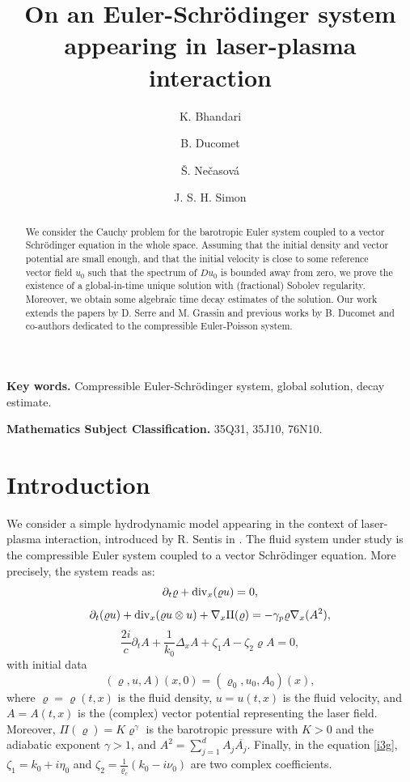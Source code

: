 \documentclass[11pt,twoside]{amsart}
\newcommand{\bFormula}[1]{\begin{equation} \label{#1}}
\newcommand{\eF}{\end{equation}}
\newcommand{\Div}{{\rm div}_x}
\newcommand{\Grad}{\nabla_x}
\newcommand{\vr}{\varrho}
\begin{document}
\title[On an Euler-Schr\"{o}dinger system appearing in laser-plasma interaction]{On an Euler-Schr\"{o}dinger system appearing in laser-plasma interaction}
\author{K. Bhandari \and B. Ducomet \and \v S. Ne\v{c}asov\'{a} \and J. S. H. Simon}

\begin{abstract}
 We consider the Cauchy problem for the barotropic Euler system coupled to a vector Schr\"{o}dinger equation in the whole space.
Assuming that the initial density and vector potential are small enough, and that the initial velocity is  close to some
reference vector field $u_0$ such that the spectrum of $Du_0$ is bounded away from zero, we prove the existence of a global-in-time unique
solution with (fractional) Sobolev regularity. Moreover, we  obtain some algebraic time decay estimates of the solution.
Our work extends the papers  by D. Serre and M. Grassin  \cite{GS,G2,S} and previous works  by B. Ducomet and co-authors \cite{BDDN,DD}
dedicated to the compressible Euler-Poisson system. 
\end{abstract}

\maketitle
{\bf Key words.} Compressible 
Euler-Schr\"{o}dinger  system, global solution, decay estimate.

\vspace{.1cm}

{\bf Mathematics Subject Classification.} 35Q31, 35J10, 76N10.



\section{Introduction}


 We consider a simple hydrodynamic
 model appearing in the context of laser-plasma interaction, introduced by R. Sentis in \cite{S1,S2}. The fluid system under study is the compressible Euler system  coupled to a vector Schr\"{o}dinger equation. 
 More precisely, the system reads as:
\bFormula{i1g}
\partial_t \vr + \Div (\vr u) = 0,
\eF
\bFormula{i2g}
\partial_t (\vr u) + \Div (\vr u \otimes u) + \Grad\Pi(\vr)
=-\gamma_p\vr\Grad (A^2),
\eF
\bFormula{i3g}
\frac{2i}{c}\partial_t A+\frac{1}{k_0}\Delta_x A
+\zeta_1 A
-\zeta_2\vr A=0,
\eF
with initial data
\bFormula{i0g}
(\vr,u,A)(x,0)=(\vr_0,u_0,A_0)(x),
\eF
where $\vr=\vr(t,x)$ is the fluid density, $u=u(t,x)$ is  the fluid velocity, and $A=A(t,x)$ is the (complex) vector potential representing the laser field.  Moreover,   
$\Pi(\vr)=K\vr^\gamma$ is the barotropic pressure  with $K>0$ and the adiabatic exponent $\gamma>1$, and $A^2 = \sum_{j=1}^d A_j \overline{A_j}$. Finally, in the equation \eqref{i3g},  $\zeta_1=k_0+i\eta_0$ and
$\zeta_2=\frac{1}{\varrho_c}\left(k_0-i\nu_0\right)$ are two complex coefficients. 
\end{document}
